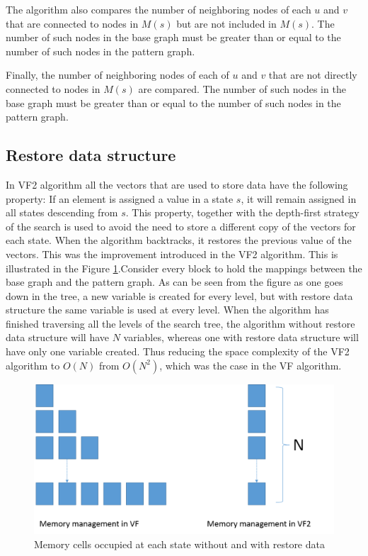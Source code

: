 The algorithm also compares the number of neighboring nodes of each $u$ and $v$ that are connected to nodes in $M(s)$ but are not
included in $M(s)$. The number of such nodes in the base graph must be greater than or equal to the number of such nodes in the pattern graph.

Finally, the number of neighboring nodes of each of $u$ and $v$ that are not directly connected to nodes in $M(s)$ are compared. The number of 
such nodes in the base graph must be greater than or equal to the number of such nodes in the pattern graph.

\subsection{Restore data structure}
In VF2 algorithm all the vectors that are used to store data have the following property: If an element is assigned a value in a state $s$, it will remain assigned in all states descending from $s$. This property, together with the depth-first strategy of the search is used to avoid the need to store a different copy of the vectors for each state. When the algorithm backtracks, it restores the previous value of the vectors. This was the improvement introduced in the VF2 algorithm. This is illustrated in the Figure \ref{fig:memManagement}.Consider every block to hold the mappings between the base graph and the pattern graph. As can be seen from the figure as one goes down in the tree, a new variable is created for every level, but with restore data structure the same variable is used at every level. When the algorithm has finished traversing all the levels of the search tree, the algorithm without restore data structure will have $N$ variables, whereas one with restore data structure will have only one variable created. Thus reducing the space complexity of the VF2 algorithm to $O(N)$ from $O(N^2)$, which was the case in the VF algorithm.

\begin{figure}[!ht]
\includegraphics[scale=0.5]{./pics/memManagement.png}
\caption{Memory cells occupied at each state without and with restore data}
\label{fig:memManagement}
\centering
\end{figure}

